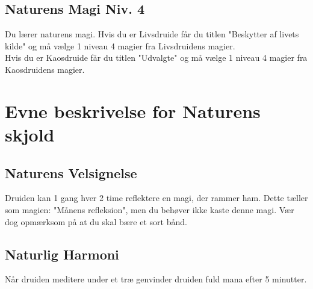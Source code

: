 \subsection{Naturens Magi Niv. 4}
Du lærer naturens magi. Hvis du er Livsdruide får du titlen "Beskytter af livets kilde" og må vælge 1 niveau 4 magier fra Livsdruidens magier.\\ Hvis du er Kaosdruide får du titlen "Udvalgte" og må vælge 1 niveau 4 magier fra Kaosdruidens magier.\\

\section{Evne beskrivelse for Naturens skjold}




\subsection{Naturens Velsignelse}
Druiden kan 1 gang hver 2 time reflektere en magi, der rammer ham. Dette tæller som magien: "Månens refleksion", men du behøver ikke kaste denne magi. Vær dog opmærksom på at du skal bære et sort bånd.

\subsection{Naturlig Harmoni}
Når druiden meditere under et træ genvinder druiden fuld mana efter 5 minutter.